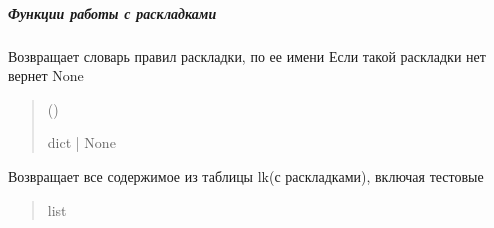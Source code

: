 \documentclass[a4paper,11pt,russian,openany,oneside]{sphinxmanual}
\begin{document}
\subparagraph{Функции работы с раскладками}
\label{\detokenize{database_module:id2}}

\begin{savenotes}\begin{fulllineitems}
\label{\detokenize{database_module:id0}}
\pysigstartsignatures
\pysiglinewithargsret
{}
{}
{}
\pysigstopsignatures
\sphinxAtStartPar
Возвращает словарь правил раскладки, по ее имени
Если такой раскладки нет \sphinxhyphen{} вернет None
\begin{quote}\begin{description}
\sphinxAtStartPar
{} ()

\sphinxAtStartPar
dict | None

\end{description}\end{quote}

\end{fulllineitems}\end{savenotes}


\begin{savenotes}\begin{fulllineitems}
\label{\detokenize{database_module:id3}}
\pysigstartsignatures
\pysiglinewithargsret
{}
{}
{}
\pysigstopsignatures
\sphinxAtStartPar
Возвращает все содержимое из таблицы lk(с раскладками), включая тестовые
\begin{quote}\begin{description}
\sphinxAtStartPar
list

\end{description}\end{quote}

\end{fulllineitems}\end{savenotes}
\end{document}
